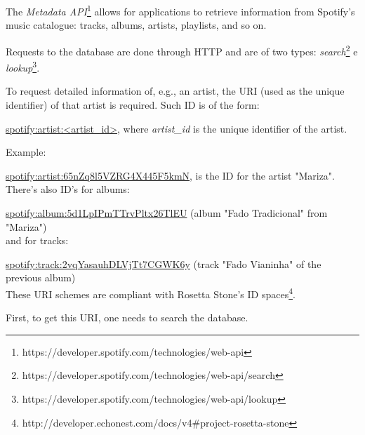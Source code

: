       The \emph{Metadata API}\footnote{https://developer.spotify.com/technologies/web-api} allows for applications to retrieve information from Spotify's music catalogue: tracks, albums, artists, playlists, and so on.

      Requests to the database are done through HTTP and are of two types: \emph{search}\footnote{https://developer.spotify.com/technologies/web-api/search} e \emph{lookup}\footnote{https://developer.spotify.com/technologies/web-api/lookup}.

      To request detailed information of, e.g., an artist, the URI (used as the unique identifier) of that artist is required. Such ID is of the form:

      \url{spotify:artist:<artist_id>}, where \emph{artist\_id} is the unique identifier of the artist.

      Example:

      \url{spotify:artist:65nZq8l5VZRG4X445F5kmN}, is the ID for the artist "Mariza". \\

      There's also ID's for albums:

      \url{spotify:album:5d1LpIPmTTrvPltx26TlEU} (album "Fado Tradicional" from "Mariza") \\

       and for tracks:

       \url{spotify:track:2vqYasauhDLVjTt7CGWK6y} (track "Fado Vianinha" of the previous album) \\

      These URI schemes are compliant with Rosetta Stone's ID spaces\footnote{http://developer.echonest.com/docs/v4\#project-rosetta-stone}.

      First, to get this URI, one needs to search the database.

